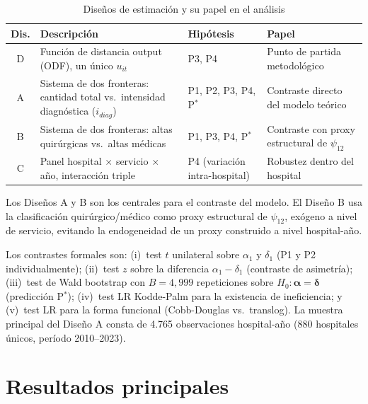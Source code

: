 \documentclass[12pt, a4paper]{article}
\newcommand{\bsym}[1]{\boldsymbol{#1}}
\begin{document}
\begin{table}[htbp]
\centering
\caption{Diseños de estimación y su papel en el análisis}
\label{tab:disenos}
\begin{threeparttable}
\small
\begin{tabular}{cp{4.5cm}p{2.8cm}p{4cm}}
\toprule
\textbf{Dis.} & \textbf{Descripción} & \textbf{Hipótesis} &
\textbf{Papel} \\
\midrule
D & Función de distancia output (ODF), un único $u_{it}$
  & P3, P4
  & Punto de partida metodológico \\[4pt]
A & Sistema de dos fronteras: cantidad total vs.\ intensidad diagnóstica ($i_{diag}$)
  & P1, P2, P3, P4, P$^*$
  & Contraste directo del modelo teórico \\[4pt]
B & Sistema de dos fronteras: altas quirúrgicas vs.\ altas médicas
  & P1, P3, P4, P$^*$
  & Contraste con proxy estructural de $\psi_{12}$ \\[4pt]
C & Panel hospital $\times$ servicio $\times$ año, interacción triple
  & P4 (variación intra-hospital)
  & Robustez dentro del hospital \\
\bottomrule
\end{tabular}
\begin{tablenotes}
  \small
  \item Los Diseños A y B son los centrales para el contraste del modelo. El
    Diseño B usa la clasificación quirúrgico/médico como proxy estructural de
    $\psi_{12}$, exógeno a nivel de servicio, evitando la endogeneidad de un
    proxy construido a nivel hospital-año.
\end{tablenotes}
\end{threeparttable}
\end{table}

Los contrastes formales son: (i)~test $t$ unilateral sobre $\alpha_1$ y
$\delta_1$ (P1 y P2 individualmente); (ii)~test $z$ sobre la diferencia
$\alpha_1 - \delta_1$ (contraste de asimetría); (iii)~test de Wald bootstrap
con $B=4{,}999$ repeticiones sobre $H_0: \bsym{\alpha} = \bsym{\delta}$
(predicción P$^*$); (iv)~test LR Kodde-Palm para la existencia de ineficiencia;
y (v)~test LR para la forma funcional (Cobb-Douglas vs.\ translog). La muestra
principal del Diseño A consta de 4.765 observaciones hospital-año (880
hospitales únicos, período 2010--2023).

\section{Resultados principales}
\end{document}
